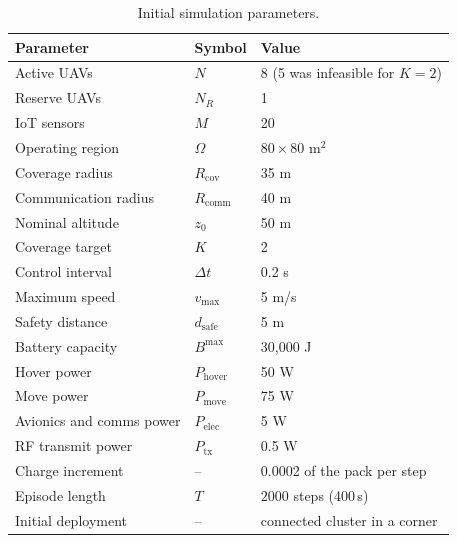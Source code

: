 \documentclass[conference]{IEEEtran}
\newcommand{\tokEpisodeSeconds}{400}
\newcommand{\tokEpisodeSteps}{2000}
\begin{document}
\begin{table}[t]
\caption{Initial simulation parameters.}
\label{tab:parameters}
\centering
\scriptsize
\setlength{\tabcolsep}{3.5pt}
\begin{tabular}{@{}lll@{}}
\toprule
Parameter & Symbol & Value \\
\midrule
Active UAVs & $N$ & 8 (5 was infeasible for $K=2$) \\
Reserve UAVs & $N_R$ & 1 \\
IoT sensors & $M$ & 20 \\
Operating region & $\Omega$ & $80\times80$ m$^2$ \\
Coverage radius & $R_{\mathrm{cov}}$ & 35 m \\
Communication radius & $R_{\mathrm{comm}}$ & 40 m \\
Nominal altitude & $z_0$ & 50 m \\
Coverage target & $K$ & 2 \\
Control interval & $\Delta t$ & 0.2 s \\
Maximum speed & $v_{\max}$ & 5 m/s \\
Safety distance & $d_{\mathrm{safe}}$ & 5 m \\
Battery capacity & $B^{\max}$ & 30,000 J \\
Hover power & $P_{\mathrm{hover}}$ & 50 W \\
Move power & $P_{\mathrm{move}}$ & 75 W \\
Avionics and comms power & $P_{\mathrm{elec}}$ & 5 W \\
RF transmit power & $P_{\mathrm{tx}}$ & 0.5 W \\
Charge increment & -- & 0.0002 of the pack per step \\
Episode length & $T$ & $\tokEpisodeSteps$ steps (\tokEpisodeSeconds\,s) \\
Initial deployment & -- & connected cluster in a corner \\
\bottomrule
\end{tabular}
\end{table}
\end{document}
